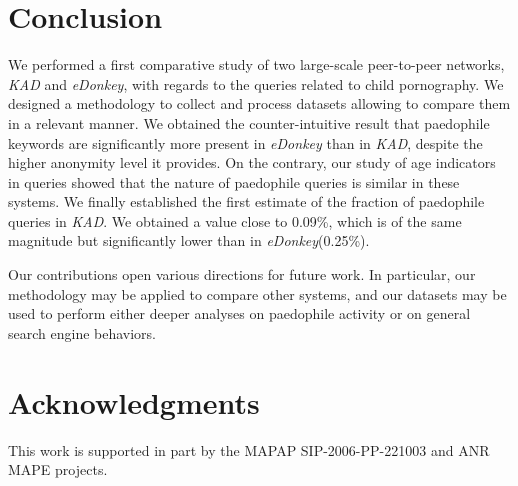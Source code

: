 \documentclass[a4paper,oneside,12pt]{article}
\newcommand{\edonkey}{{\em eDonkey}\xspace}
\newcommand{\kad}{{\em KAD}\xspace}
\begin{document}
\section{Conclusion}\label{sec-conclu}

We performed a first comparative study of two large-scale peer-to-peer networks, \kad and \edonkey, with regards to the queries related to child pornography. We designed a methodology to collect and process datasets allowing to compare them in a relevant manner. We obtained the counter-intuitive result that paedophile keywords are significantly more present in \edonkey than in \kad, despite the higher anonymity level it provides. On the contrary, our study of age indicators in queries showed that the nature of paedophile queries is similar in these systems. We finally established the first estimate of the fraction of paedophile queries in \kad. We obtained a value close to 0.09\%, which is of the same magnitude but significantly lower than in \edonkey (0.25\%). 

Our contributions open various directions for future work. 
In particular, our methodology may be applied to compare other systems, and our datasets may be used to perform either deeper analyses on paedophile activity or on general search engine behaviors. 

\section*{Acknowledgments}
This work is supported in part by the MAPAP SIP-2006-PP-221003 and ANR MAPE projects.




\label{theend}
\end{document}
